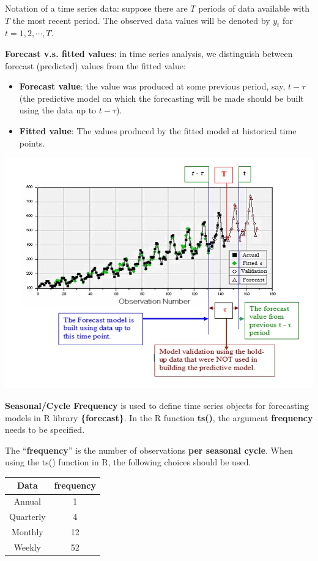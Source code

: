 \documentclass[
]{book}
\begin{document}
Notation of a time series data: suppose there are \(T\) periods of data available with \(T\) the most recent period. The observed data values will be denoted by \(y_t\) for \(t = 1, 2, \cdots, T\).

\textbf{Forecast v.s. fitted values}: in time series analysis, we distinguish between forecast (predicted) values from the fitted value:

\begin{itemize}
\item
  \textbf{Forecast value}: the value was produced at some previous period, say, \(t - \tau\) (the predictive model on which the forecasting will be made should be built using the data up to \(t - \tau\)).
\item
  \textbf{Fitted value}: The values produced by the fitted model at historical time points.
\end{itemize}

\begin{center}\includegraphics[width=0.8\linewidth]{img11/w11-ConceptsDefinition} \end{center}

\textbf{Seasonal/Cycle Frequency} is used to define time series objects for forecasting models in R library \textbf{\{forecast\}}. In the R function \textbf{ts()}, the argument \textbf{frequency} needs to be specified.

The ``\textbf{frequency}'' is the number of observations \textbf{\color{red}per seasonal cycle}. When using the ts() function in R, the following choices should be used.

\begin{longtable}[]{@{}cc@{}}
\toprule\noalign{}
Data & frequency \\
\midrule\noalign{}
\endhead
\bottomrule\noalign{}
\endlastfoot
Annual & 1 \\
Quarterly & 4 \\
Monthly & 12 \\
Weekly & 52 \\
\end{longtable}
\end{document}
